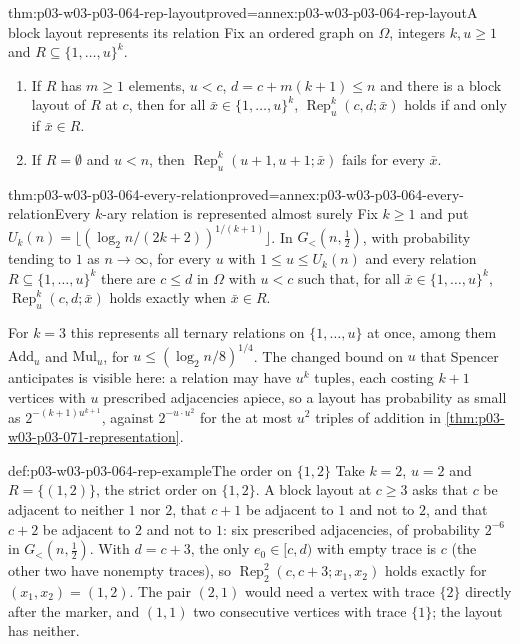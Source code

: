 \begin{hblemma}{thm:p03-w03-p03-064-rep-layout}{proved=annex:p03-w03-p03-064-rep-layout}{A block layout represents its relation}
Fix an ordered graph on \(\Omega\), integers \(k,u\geq1\) and
\(R\subseteq\{1,\ldots,u\}^k\).
\begin{enumerate}
\item If \(R\) has \(m\geq1\) elements, \(u<c\), \(d=c+m(k+1)\leq n\) and
  there is a block layout of \(R\) at \(c\), then for all
  \(\bar x\in\{1,\ldots,u\}^k\), \(\operatorname{Rep}^k_u(c,d;\bar x)\)
  holds if and only if \(\bar x\in R\).
\item If \(R=\emptyset\) and \(u<n\), then
  \(\operatorname{Rep}^k_u(u+1,u+1;\bar x)\) fails for every \(\bar x\).
\end{enumerate}
\end{hblemma}

\begin{hbtheorem}{thm:p03-w03-p03-064-every-relation}{proved=annex:p03-w03-p03-064-every-relation}{Every \(k\)-ary relation is represented almost surely}
Fix \(k\geq1\) and put
\(U_k(n)=\bigl\lfloor(\log_2n/(2k+2))^{1/(k+1)}\bigr\rfloor\).  In
\(G_<(n,\frac12)\), with probability tending to \(1\) as \(n\to\infty\),
for every \(u\) with \(1\leq u\leq U_k(n)\) and every relation
\(R\subseteq\{1,\ldots,u\}^k\) there are \(c\leq d\) in \(\Omega\) with
\(u<c\) such that, for all \(\bar x\in\{1,\ldots,u\}^k\),
\(\operatorname{Rep}^k_u(c,d;\bar x)\) holds exactly when \(\bar x\in R\).
\end{hbtheorem}

For \(k=3\) this represents all ternary relations on \(\{1,\ldots,u\}\) at
once, among them \(\mathrm{Add}_u\) and \(\mathrm{Mul}_u\), for
\(u\leq(\log_2n/8)^{1/4}\).  The changed bound on \(u\) that Spencer
anticipates is visible here: a relation may have \(u^k\) tuples, each costing
\(k+1\) vertices with \(u\) prescribed adjacencies apiece, so a layout has
probability as small as \(2^{-(k+1)u^{k+1}}\), against \(2^{-u\cdot u^2}\)
for the at most \(u^2\) triples of addition in
\cref{thm:p03-w03-p03-071-representation}.

\begin{hbexample}{def:p03-w03-p03-064-rep-example}{The order on \(\{1,2\}\)}
Take \(k=2\), \(u=2\) and \(R=\{(1,2)\}\), the strict order on
\(\{1,2\}\).  A block layout at \(c\geq3\) asks that \(c\) be adjacent to
neither \(1\) nor \(2\), that \(c+1\) be adjacent to \(1\) and not to \(2\),
and that \(c+2\) be adjacent to \(2\) and not to \(1\): six prescribed
adjacencies, of probability \(2^{-6}\) in \(G_<(n,\frac12)\).  With
\(d=c+3\), the only \(e_0\in[c,d)\) with empty trace is \(c\) (the other two
have nonempty traces), so \(\operatorname{Rep}^2_2(c,c+3;x_1,x_2)\) holds
exactly for \((x_1,x_2)=(1,2)\).  The pair \((2,1)\) would need a vertex with
trace \(\{2\}\) directly after the marker, and \((1,1)\) two consecutive
vertices with trace \(\{1\}\); the layout has neither.
\end{hbexample}

